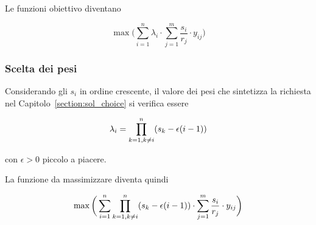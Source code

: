 Le funzioni obiettivo diventano

\begin{equation}
    \max \bigg( \sum_{i=1}^{n} \lambda_{i} \cdot \sum_{j = 1}^{m}\frac{s_i}{r_j} \cdot y_{ij}\bigg)
    \label{eq:}
\end{equation}

\subsubsection{Scelta dei pesi}

Considerando gli $s_i$ in ordine crescente, il valore dei pesi che sintetizza la richiesta 
nel Capitolo~\ref{section:sol_choice} si verifica essere

\begin{equation}
    \lambda_i = \prod_{k=1,\\ k\neq i}^{n} (s_k - \epsilon (i -1))
    \label{eq:}
\end{equation}

\noindent
con $\epsilon > 0$ piccolo a piacere.

La funzione da massimizzare diventa quindi

\begin{equation}
    \max \bigg( \sum_{i=1}^{n} \prod_{k=1,\\ k\neq i}^{n} (s_k - \epsilon (i- 1)) \cdot \sum_{j = 1}^{m}\frac{s_i}{r_j} \cdot y_{ij}\bigg)
    \label{eq:single_obj}
\end{equation}

